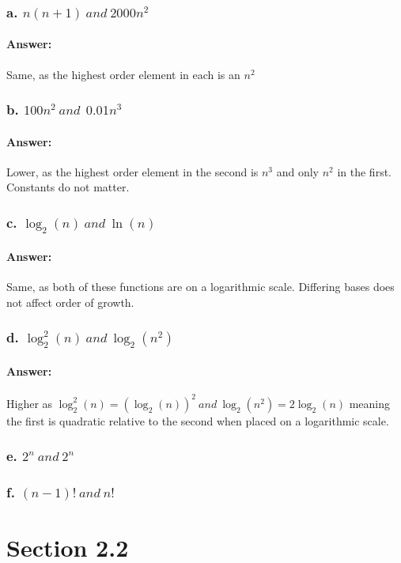 \documentclass{article}
\begin{document}
    \subsubsection{a. $n(n + 1) \ and \ 2000n^2$}
      \paragraph{Answer:}
        Same, as the highest order element in each is an $n^2$
    \subsubsection{b. $100n^2 \ and \ \ 0.01n^3$}
      \paragraph{Answer:}
        Lower, as the highest order element in the second is $n^3$ and only $n^2$ in the first. Constants do not matter.
    \subsubsection{c. $\log_{2}(n) \ and \ \ln(n)$}
      \paragraph{Answer:}
        Same, as both of these functions are on a logarithmic scale. Differing bases does not affect order of growth.
    \subsubsection{d. $\log_{2}^2(n) \ and \ \log_{2}(n^2)$}
      \paragraph{Answer:}
        Higher as $\log_{2}^2(n) = (\log_{2}(n))^2 \ and \ \log_{2}(n^2) = 2\log_{2}(n)$ meaning the first is quadratic relative to the second when placed on a logarithmic scale.
    \subsubsection{e. $2^n \ and \ 2^n$}
    \subsubsection{f. $(n − 1)! \ and \ n!$}
\section{Section 2.2}
\end{document}
